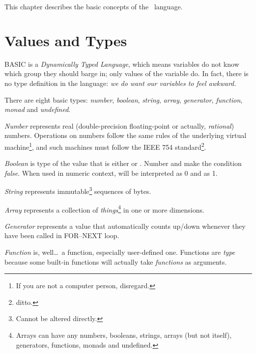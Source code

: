 \quad
{}

This chapter describes the basic concepts of the \tbas\ language.


\section{Values and Types}
\label{valuesandtypes}

BASIC is a \emph{Dynamically Typed Language}, which means variables do not know which group they should barge in; only values of the variable do. In fact, there is no type definition in the language: \emph{we do want our variables to feel awkward.}

There are eight basic types: \emph{number}, \emph{boolean}, \emph{string}, \emph{array}, \emph{generator}, \emph{function}, \emph{monad} and \emph{undefined}.

\emph{Number} represents real (double-precision floating-point or actually, \emph{rational}) numbers. Operations on numbers follow the same rules of the underlying virtual machine\footnote{If you are not a computer person, disregard.}, and such machines must follow the IEEE 754 standard\footnote{ditto.}. 

\emph{Boolean} is type of the value that is either  or . Number  and  make the condition \emph{false}. When used in numeric context,  will be interpreted as 0 and  as 1.

\emph{String} represents immutable\footnote{Cannot be altered directly.} sequences of bytes.

\emph{Array} represents a collection of \emph{things}\footnote{Arrays can have any numbers, booleans, strings, arrays (but not itself), generators, functions, monads and undefined.} in one or more dimensions.

\emph{Generator} represents a value that automatically counts up/down whenever they have been called in FOR--NEXT loop.

\emph{Function} is, well\ldots\ a function, especially user-defined one. Functions are \emph{type} because some built-in functions will actually take \emph{functions} as arguments.

